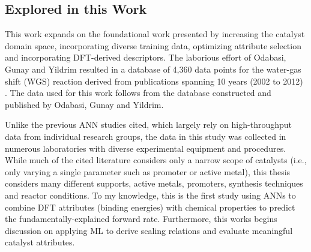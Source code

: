 	\subsection{Explored in this Work}
	This work expands on the foundational work presented by increasing the catalyst domain space, incorporating diverse training data, optimizing attribute selection and incorporating DFT-derived descriptors. The laborious effort of Odabasi, Gunay and Yildrim resulted in a database of 4,360 data points for the water-gas shift (WGS) reaction derived from publications spanning 10 years (2002 to 2012) \cite{Odabasi_2014}. The data used for this work follows from the database constructed and published by Odabasi, Gunay and Yildrim. 

	Unlike the previous ANN studies cited, which largely rely on high-throughput data from individual research groups, the data in this study was collected in numerous laboratories with diverse experimental equipment and procedures. While much of the cited literature considers only a narrow scope of catalysts (i.e., only varying a single parameter such as promoter or active metal), this thesis considers many different supports, active metals, promoters, synthesis techniques and reactor conditions. To my knowledge, this is the first study using ANNs to combine DFT attributes (binding energies) with chemical properties to predict the fundamentally-explained forward rate. Furthermore, this works begins discussion on applying ML to derive scaling relations and evaluate meaningful catalyst attributes.  


